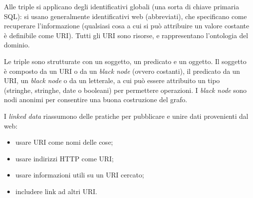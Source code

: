 \documentclass[11pt, twocolumn]{article}
\begin{document}
Alle triple si applicano degli identificativi globali (una sorta di chiave primaria SQL): si usano generalmente identificativi web (abbreviati), che specificano come recuperare l'informazione (qualsiasi cosa a cui si può attribuire un valore costante è definibile come URI).
Tutti gli URI sono risorse, e rappresentano l'ontologia del dominio.

Le triple sono strutturate con un soggetto, un predicato e un oggetto.
Il soggetto è composto da un URI o da un \textit{black node} (ovvero costanti), il predicato da un URI, un \textit{black node} o da un letterale, a cui può essere attribuito un tipo (stringhe, stringhe, date o booleani) per permettere operazioni.
I \textit{black node} sono nodi anonimi per consentire una buona costruzione del grafo.


I \textit{linked data} riassumono delle pratiche per pubblicare e unire dati provenienti dal web:
\begin{itemize}
  \item usare URI come nomi delle cose;
  \item usare indirizzi HTTP come URI;
  \item usare informazioni utili su un URI cercato;
  \item includere link ad altri URI.
\end{itemize}
\end{document}
